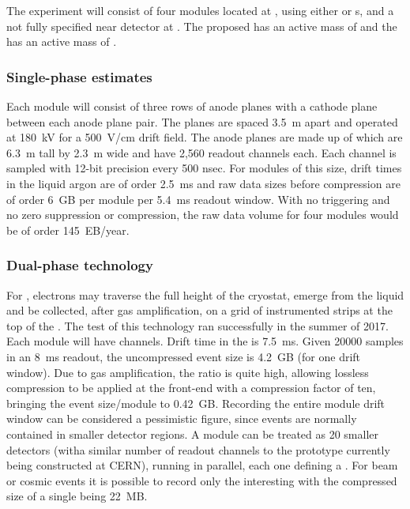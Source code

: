 The  experiment will consist of four \larmass {} modules located at  \surf, using either  or  \lartpc{}s, and a not fully specified near detector at \fnal. The proposed   has an active mass of \spactivelarmass and the  has an active mass of \dpactivelarmass{}.

\subsubsection{Single-phase estimates}
Each \single module will consist of three rows of anode planes with a cathode plane between  each anode plane pair. The planes are spaced \SI{3.5}{m} 
apart and operated at \SI{180}{kV} for a \SI{500}{V/cm} drift field. 
The anode planes are made up of  which are 6.3~m tall by 2.3~m wide and have 2,560 readout channels each. Each channel is sampled with 12-bit precision every 500 nsec. %
For modules of this size, drift times in the liquid argon are of order 2.5~ms and raw data sizes before compression are of order 6~GB per module per 5.4~ms readout window.  With no triggering and no zero suppression or compression, the raw data volume for four modules would be of order 145~EB/year. 




\subsubsection{Dual-phase technology}

For \dual, electrons may traverse the full height of the cryostat, emerge from the liquid and be collected,  after gas amplification, on a grid of instrumented strips at the top of the .  The  test of this technology ran successfully in the summer of 2017\cite{Murphy:20170516}. 
Each \dpactivelarmass module will have \dpnumcrpch channels. Drift time in the \lar is \SI{7.5}{ms}. Given \num{20000} samples in an \SI{8}{ms} readout, the uncompressed event size is \SI{4.2}{GB} (for one  drift window).  Due to gas amplification, the  ratio is quite high, allowing lossless compression to be applied at the front-end  with a compression factor of ten, bringing the event size/module to  \SI{0.42}{GB}. Recording the entire module drift window can be considered a pessimistic figure, since events are normally contained in smaller detector regions. A  module can be treated as \num{20} smaller detectors (witha similar number  of readout channels to the prototype currently being constructed at CERN), running in parallel, each one defining a . For beam or cosmic events it is possible to record only the interesting  with the compressed size of a single  being \SI{22}{MB}.

